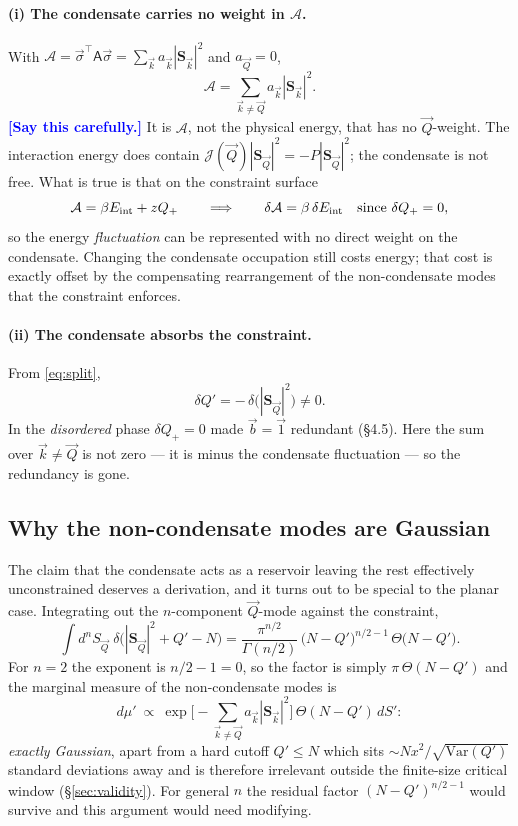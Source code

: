 \documentclass[11pt,a4paper]{article}
\newcommand{\Jc}{\mathcal{J}}
\newcommand{\bk}{\vec k}
\newcommand{\bQ}{\vec Q}
\newcommand{\FLAG}[1]{\textcolor{blue}{\textbf{[#1]}}}
\newcommand{\Jc}{\mathcal{J}}
\newcommand{\Ac}{\mathcal{A}}
\newcommand{\bk}{\vec k}
\newcommand{\bQ}{\vec Q}
\newcommand{\bs}{\vec\sigma}
\newcommand{\FLAG}[1]{\textcolor{blue}{\textbf{[#1]}}}
\begin{document}
\paragraph{(i) The condensate carries no weight in $\Ac$.} With
$\Ac=\bs^\top\mathsf A\bs=\sum_{\bk}a_{\bk}|\bm S_{\bk}|^2$ and $a_{\bQ}=0$,
\begin{equation}
  \Ac=\sum_{\bk\neq\bQ}a_{\bk}|\bm S_{\bk}|^2 .
\end{equation}
\FLAG{Say this carefully.} It is $\Ac$, not the physical energy, that has no $\bQ$-weight.
The interaction energy does contain $\Jc(\bQ)|\bm S_{\bQ}|^2=-P|\bm S_{\bQ}|^2$; the
condensate is not free. What is true is that on the constraint surface
\begin{equation}
  \Ac=\beta E_{\rm int}+zQ_+
  \qquad\Longrightarrow\qquad
  \delta\Ac=\beta\,\delta E_{\rm int}\quad\text{since }\delta Q_+=0 ,
\end{equation}
so the energy \emph{fluctuation} can be represented with no direct weight on the condensate.
Changing the condensate occupation still costs energy; that cost is exactly offset by the
compensating rearrangement of the non-condensate modes that the constraint enforces.

\paragraph{(ii) The condensate absorbs the constraint.} From \eqref{eq:split},
\begin{equation}
  \delta Q'=-\,\delta\big(|\bm S_{\bQ}|^2\big)\neq0 .
  \label{eq:reservoir}
\end{equation}
In the \emph{disordered} phase $\delta Q_+=0$ made $\vec b=\vec1$ redundant (\S4.5). Here
the sum over $\bk\neq\bQ$ is not zero --- it is minus the condensate fluctuation --- so the
redundancy is gone.

\subsection{Why the non-condensate modes are Gaussian}
\label{sec:gaussian}
The claim that the condensate acts as a reservoir leaving the rest effectively
unconstrained deserves a derivation, and it turns out to be special to the planar case.
Integrating out the $n$-component $\bQ$-mode against the constraint,
\begin{equation}
  \int d^{n}S_{\bQ}\;\delta\big(|\bm S_{\bQ}|^2+Q'-N\big)
   =\frac{\pi^{n/2}}{\Gamma(n/2)}\,\big(N-Q'\big)^{n/2-1}\,\Theta\big(N-Q'\big) .
\end{equation}
For $n=2$ the exponent is $n/2-1=0$, so the factor is simply $\pi\,\Theta(N-Q')$ and the
marginal measure of the non-condensate modes is
\begin{equation}
  d\mu'\ \propto\ \exp\Big[-\sum_{\bk\neq\bQ}a_{\bk}|\bm S_{\bk}|^2\Big]\,\Theta(N-Q')\,dS' :
\end{equation}
\emph{exactly Gaussian}, apart from a hard cutoff $Q'\le N$ which sits
$\sim Nx^2/\sqrt{\mathrm{Var}(Q')}$ standard deviations away and is therefore irrelevant
outside the finite-size critical window (\S\ref{sec:validity}). For general $n$ the residual
factor $(N-Q')^{n/2-1}$ would survive and this argument would need modifying.
\end{document}
